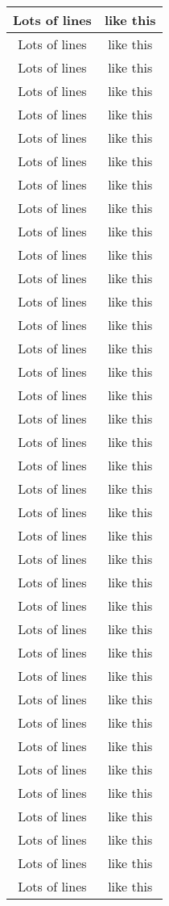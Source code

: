 \documentclass[12pt, a4paper]{article}
\begin{document}
\begin{longtable}[c]{| c | c |}
 Lots of lines & like this\\ \hline
 Lots of lines & like this\\ \hline
 Lots of lines & like this\\
 Lots of lines & like this\\
 Lots of lines & like this\\
 Lots of lines & like this\\
 Lots of lines & like this\\
 Lots of lines & like this\\
 Lots of lines & like this\\
 Lots of lines & like this\\
 Lots of lines & like this\\
 Lots of lines & like this\\
 Lots of lines & like this\\
 Lots of lines & like this\\
 Lots of lines & like this\\
 Lots of lines & like this\\
 Lots of lines & like this\\
 Lots of lines & like this\\
 Lots of lines & like this\\
 Lots of lines & like this\\
 Lots of lines & like this\\
 Lots of lines & like this\\
 Lots of lines & like this\\
 Lots of lines & like this\\
 Lots of lines & like this\\
 Lots of lines & like this\\
 Lots of lines & like this\\
 Lots of lines & like this\\
 Lots of lines & like this\\
 Lots of lines & like this\\
 Lots of lines & like this\\
 Lots of lines & like this\\
 Lots of lines & like this\\
 Lots of lines & like this\\
 Lots of lines & like this\\
 Lots of lines & like this\\
 Lots of lines & like this\\
 Lots of lines & like this\\

\end{longtable}
\end{document}
